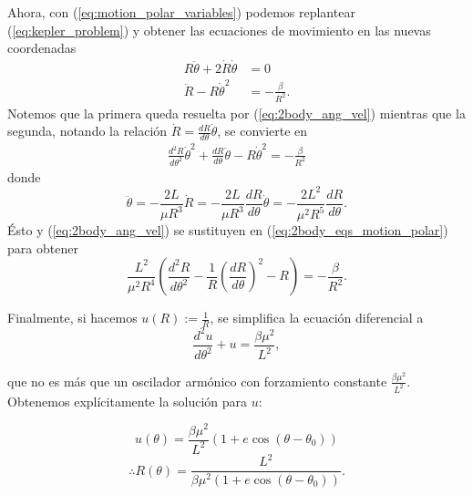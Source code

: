 Ahora, con (\ref{eq:motion_polar_variables}) podemos replantear (\ref{eq:kepler_problem}) y obtener las ecuaciones de movimiento en las nuevas coordenadas
\begin{align}
 R \ddot{\theta} + 2 \dot{R} \dot{\theta} &= 0 \\
 \ddot{R} - R \dot{\theta}^2 &= -\frac{\beta}{R^2}.
 \label{eq:2body_eqs_motion_polar}
\end{align}
Notemos que la primera queda resuelta por (\ref{eq:2body_ang_vel}) mientras que la segunda, notando la relación $\dot{R} = \frac{d R}{d\theta} \dot{\theta}$, se convierte en
\begin{align*}
 \frac{d^2 R}{d \theta^2} \dot{\theta}^2 + \frac{dR}{d\theta} \ddot{\theta} - R \dot{\theta}^2 = - \frac{\beta}{R^2}
\end{align*}
donde 
\begin{equation*}
 \ddot{\theta} = -\frac{2L}{\mu R^3}\dot{R} = -\frac{2L}{\mu R^3} \frac{dR}{d\theta}\dot{\theta} = - \frac{2L^2}{\mu^2 R^5} \frac{dR}{d\theta}.
\end{equation*}
Ésto y (\ref{eq:2body_ang_vel}) se sustituyen en  (\ref{eq:2body_eqs_motion_polar}) para obtener
\begin{equation*}
 \frac{L^2}{\mu^2 R^4}\left( \frac{d^2R}{d\theta^2} - \frac{1}{R} \left(\frac{dR}{d\theta} \right)^2 -R \right) = - \frac{\beta}{R^2}.
\end{equation*}

Finalmente, si hacemos $u(R) := \frac{1}{R}$, se simplifica la ecuación diferencial a
\begin{equation}
 \frac{d^2u}{d\theta^2} + u = \frac{\beta \mu^2}{L^2},
\end{equation}

que no es más que un oscilador armónico con forzamiento constante $\frac{\beta \mu^2}{L^2}$. Obtenemos explícitamente la solución para $u$:

\begin{equation*}
 u(\theta) = \frac{\beta \mu^2}{L^2} \left( 1 + e \cos (\theta - \theta_0 ) \right) 
\end{equation*}
\begin{equation}
 \therefore R(\theta) = \frac{L^2}{\beta \mu^2 \left(1 + e \cos (\theta - \theta_0) \right)}.
 \label{eq:2body_solution}
\end{equation}


